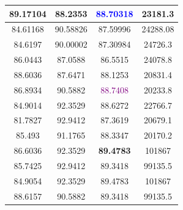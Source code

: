 \documentclass[11pt,a4paper]{article}
\theoremstyle{definition}
\begin{document}
\begin{tabbing}
{\begin{tabular}{|c|c|c|c|}
89.17104 & 88.2353 & \textcolor{blue}{88.70318} & 23181.3\\ \hline
84.61168 & 90.58826 & 87.59996 & 24288.08\\ \hline
84.6197 & 90.00002 & 87.30984 & 24726.3\\ \hline
86.0443 & 87.0588 & 86.5515 & 24078.8 \\ \hline
88.6036 & 87.6471 & 88.1253 & 20831.4 \\ \hline
86.8934 & 90.5882 & \textcolor{purple}{88.7408} & 20233.8 \\ \hline
84.9014 & 92.3529 & 88.6272 & 22766.7 \\ \hline
81.7827 & 92.9412 & 87.3619 & 20679.1 \\ \hline
85.493 & 91.1765 & 88.3347 & 20170.2 \\ \hline
86.6036 & 92.3529 & \textbf{89.4783} & 101867 \\ \hline
85.7425 & 92.9412 & 89.3418 & 99135.5 \\ \hline
84.9054 & 92.3529 & 89.4783 & 101867 \\ \hline
88.6157 & 90.5882 & 89.3418 & 99135.5 \\ \hline

		\end{tabular}
		
}
\end{tabbing}
\end{document}
